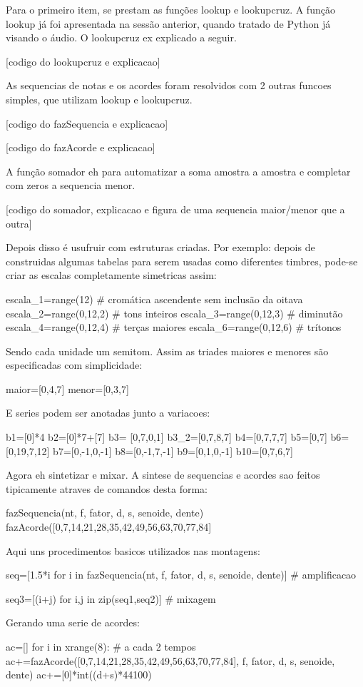 Para o primeiro item, se prestam as funções lookup e lookupcruz. A função
lookup já foi apresentada na sessão anterior, quando tratado de Python já visando o áudio.
O lookupcruz ex explicado a seguir.

[codigo do lookupcruz e explicacao]

As sequencias de notas e os acordes foram resolvidos com 2 outras funcoes simples,
que utilizam lookup e lookupcruz.

[codigo do fazSequencia e explicacao]

[codigo do fazAcorde e explicacao]

A função somador eh para automatizar a soma amostra a amostra e completar com zeros a
sequencia menor.

[codigo do somador, explicacao e figura de uma sequencia maior/menor que a outra]

Depois disso é usufruir com estruturas criadas. Por exemplo: depois de construidas
algumas tabelas para serem usadas como diferentes timbres, pode-se criar as
escalas completamente simetricas assim:

escala\_1=range(12) # cromática ascendente sem inclusão da oitava
escala\_2=range(0,12,2) # tons inteiros
escala\_3=range(0,12,3) # diminutão
escala\_4=range(0,12,4) # terças maiores
escala\_6=range(0,12,6) # trítonos

Sendo cada unidade um semitom. Assim as triades maiores e menores
são especificadas com simplicidade:

maior=[0,4,7]
menor=[0,3,7]

E series podem ser anotadas junto a variacoes:

b1=[0]*4
b2=[0]*7+[7]
b3=  [0,7,0,1]
b3\_2=[0,7,8,7]
b4=[0,7,7,7]
b5=[0,7]
b6=[0,19,7,12]
b7=[0,-1,0,-1]
b8=[0,-1,7,-1]
b9=[0,1,0,-1]
b10=[0,7,6,7]

Agora eh sintetizar e mixar. A sintese de sequencias e acordes sao feitos tipicamente
atraves de comandos desta forma:

fazSequencia(nt, f, fator, d, s, senoide, dente)
fazAcorde([0,7,14,21,28,35,42,49,56,63,70,77,84]

Aqui uns procedimentos basicos utilizados nas montagens:

seq=[1.5*i for i in fazSequencia(nt, f, fator, d, s, senoide, dente)] # amplificacao

seq3=[(i+j) for i,j in zip(seq1,seq2)] # mixagem

Gerando uma serie de acordes:

ac=[]
for i in xrange(8): # a cada 2 tempos
    ac+=fazAcorde([0,7,14,21,28,35,42,49,56,63,70,77,84], f, fator, d, s, senoide, dente)
    ac+=[0]*int((d+s)*44100)

